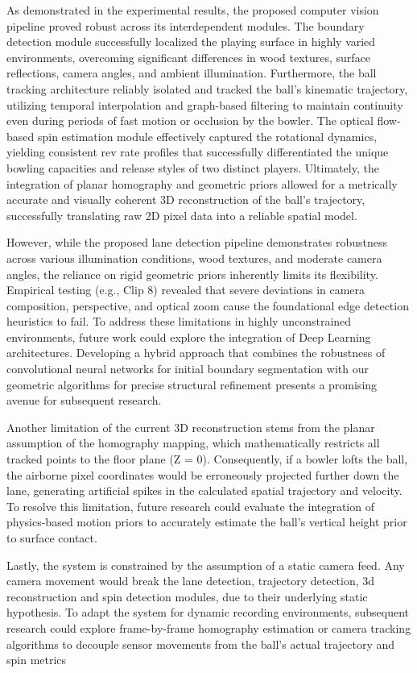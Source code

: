 As demonstrated in the experimental results, the proposed computer vision pipeline proved robust across its interdependent modules. The boundary detection module successfully localized the playing surface in highly varied environments, overcoming significant differences in wood textures, surface reflections, camera angles, and ambient illumination. Furthermore, the ball tracking architecture reliably isolated and tracked the ball's kinematic trajectory, utilizing temporal interpolation and graph-based filtering to maintain continuity even during periods of fast motion or occlusion by the bowler. The optical flow-based spin estimation module effectively captured the rotational dynamics, yielding consistent rev rate profiles that successfully differentiated the unique bowling capacities and release styles of two distinct players. Ultimately, the integration of planar homography and geometric priors allowed for a metrically accurate and visually coherent 3D reconstruction of the ball's trajectory, successfully translating raw 2D pixel data into a reliable spatial model.

However, while the proposed lane detection pipeline demonstrates robustness across various illumination conditions, wood textures, and moderate camera angles, the reliance on rigid geometric priors inherently limits its flexibility. Empirical testing (e.g., Clip 8) revealed that severe deviations in camera composition, perspective, and optical zoom cause the foundational edge detection heuristics to fail. To address these limitations in highly unconstrained environments, future work could explore the integration of Deep Learning architectures. Developing a hybrid approach that combines the robustness of convolutional neural networks for initial boundary segmentation with our geometric algorithms for precise structural refinement presents a promising avenue for subsequent research.


Another limitation of the current 3D reconstruction stems from the planar assumption of the homography mapping, which mathematically restricts all tracked points to the floor plane (Z = 0). Consequently, if a bowler lofts the ball, the airborne pixel coordinates would be erroneously projected further down the lane, generating artificial spikes in the calculated spatial trajectory and velocity. To resolve this limitation, future research could evaluate the integration of physics-based motion priors to accurately estimate the ball's vertical height prior to surface contact.

Lastly, the system is constrained by the assumption of a static camera feed. Any camera movement would break the lane detection, trajectory detection, 3d reconstruction and spin detection modules, due to their underlying static hypothesis. To adapt the system for dynamic recording environments, subsequent research could explore frame-by-frame homography estimation or camera tracking algorithms to decouple sensor movements from the ball’s actual trajectory and spin metrics